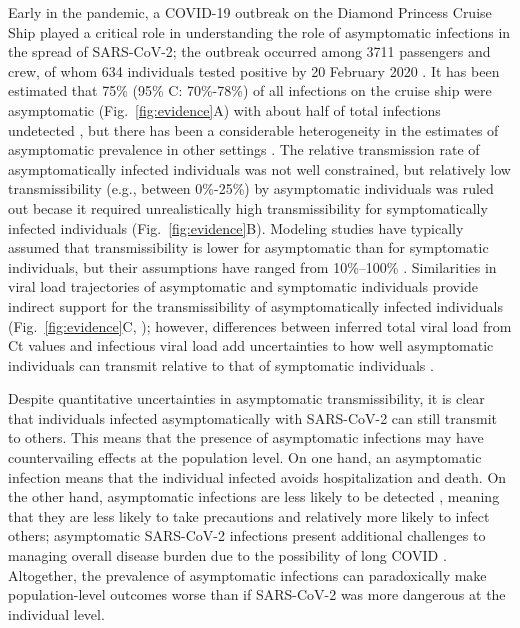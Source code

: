 \documentclass[12pt]{article}
\newcommand{\fref}[1]{Fig.~\ref{fig:#1}}
\begin{document}
Early in the pandemic, a COVID-19 outbreak on the Diamond Princess Cruise Ship played a critical role in understanding the role of asymptomatic infections in the spread of SARS-CoV-2;
the outbreak occurred among 3711 passengers and crew, of whom 634 individuals tested positive by 20 February 2020 \citep{mizumoto2020estimating}.
It has been estimated that 75\% (95\% C: 70\%-78\%) of all infections on the cruise ship were asymptomatic (\fref{evidence}A) with about half of total infections undetected \citep{emery2020}, but there has been a considerable heterogeneity in the estimates of asymptomatic prevalence in other settings \citep{alene2021magnitude}.
The relative transmission rate of asymptomatically infected individuals was not well constrained, but relatively low transmissibility (e.g., between 0\%-25\%) by asymptomatic individuals was ruled out becase it required unrealistically high transmissibility for symptomatically infected individuals (\fref{evidence}B).
Modeling studies have typically assumed that transmissibility is lower for asymptomatic than for symptomatic individuals, but their assumptions have ranged from 10\%--100\% \citep{ferretti2020quantifying,lavezzo2020}.
Similarities in viral load trajectories of asymptomatic and symptomatic individuals provide indirect support for the transmissibility of asymptomatically infected individuals (\fref{evidence}C, \citep{Kissler2020}); 
however, differences between inferred total viral load from Ct values and infectious viral load add uncertainties to how well asymptomatic individuals can transmit relative to that of symptomatic individuals \citep{romero2021ct}.

Despite quantitative uncertainties in asymptomatic transmissibility, it is clear that individuals infected asymptomatically with SARS-CoV-2 can still transmit to others. 
This means that the presence of asymptomatic infections may have countervailing effects at the population level. 
On one hand, an asymptomatic infection means that the individual infected avoids hospitalization and death. 
On the other hand, asymptomatic infections are less likely to be detected \citep{fraser2004factors}, meaning that they are less likely to take precautions and relatively more likely to infect others;
asymptomatic SARS-CoV-2 infections present additional challenges to managing overall disease burden due to the possibility of long COVID \citep{xie2022long}.
Altogether, the prevalence of asymptomatic infections can paradoxically make population-level outcomes worse than if SARS-CoV-2 was more dangerous at the individual level.
\end{document}
